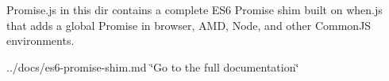 Promise.\+js in this dir contains a complete ES6 Promise shim built on when.\+js that adds a global {\ttfamily Promise} in browser, AMD, Node, and other Common\+JS environments.

../docs/es6-\/promise-\/shim.md \char`\"{}\+Go to the full documentation\char`\"{} 